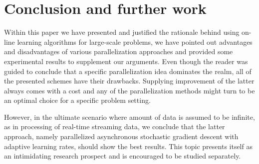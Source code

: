 \section{Conclusion and further work}
Within this paper we have presented and justified the rationale behind using on-line learning algorithms for large-scale problems, we have pointed out advantages and disadvantages of various parallelization approaches and provided some experimental results to supplement our arguments. Even though the reader was guided to conclude that a specific parallelization idea dominates the realm, all of the presented schemes have their drawbacks. Supplying improvement of the latter always comes with a cost and any of the parallelization methods might turn to be an optimal choice for a specific problem setting. 

However, in the ultimate scenario where amount of data is assumed to be infinite, as in processing of real-time streaming data, we conclude that the latter approach, namely parallelized asynchronous stochastic gradient descent with adaptive learning rates, should show the best results. This topic presents itself as an intimidating research prospect and is encouraged to be studied separately.
